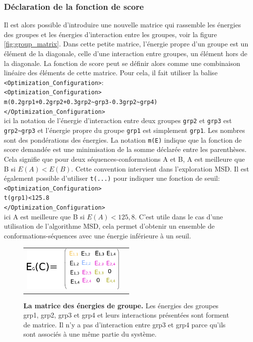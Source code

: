 \subsubsection{Déclaration de la fonction de score}
\label{sub:score}
Il est alors possible d'introduire une nouvelle matrice qui rassemble les énergies des groupes et les énergies d'interaction entre les groupes, voir la figure \ref{fig:group_matrix}. Dans cette petite matrice, l'énergie propre d'un groupe est un élément de la diagonale, celle d'une interaction entre groupes, un élément hors de la diagonale. La fonction de score peut se définir alors comme une combinaison linéaire des éléments de cette matrice. Pour cela, il fait utiliser la balise  \verb!<Optimization_Configuration>!:\\
\verb!<Optimization_Configuration>! \\
\verb!m(0.2grp1+0.2grp2+0.3grp2~grp3-0.3grp2~grp4)! \\
\verb!</Optimization_Configuration>! \\
ici la notation de l'énergie d'interaction entre deux groupes \verb!grp2! et \verb!grp3! est \verb!grp2~grp3! et l'énergie propre du groupe \verb!grp1! est simplement \verb!grp1!. Les nombres sont des pondérations des énergies. La notation \verb!m(E)! indique que la fonction de score demandée est une minimisation de la somme déclarée entre les parenthèses. Cela signifie que pour deux séquences-conformations A et B, A est meilleure que B si $E(A) < E(B)$. Cette convention intervient dans l'exploration MSD. Il est également possible d'utiliser \verb!t(...)! pour indiquer une fonction de seuil:\\
\verb!<Optimization_Configuration>! \\
\verb!t(grp1)<125.8! \\
\verb!</Optimization_Configuration>! \\
ici A est meilleure que B si $E(A)<125,8$. C'est utile dans le cas d'une utilisation de l'algorithme MSD, cela permet d'obtenir un ensemble de conformations-séquences avec une énergie inférieure à un seuil.
\begin{figure}[!htbp]
  \centering
  \begin{tabular}{cc}
    \includegraphics[width=5cm]{figure/group_matrix.png} &
  \end{tabular}
  
  \caption{\textbf{La matrice des énergies de groupe.} Les énergies des groupes grp1, grp2, grp3 et grp4 et leurs interactions présentées sont forment de matrice. Il n'y a pas d'interaction entre grp3 et grp4 parce qu'ils sont associés à une même partie du système.}
  \label{fig:groupmatrix}
\end{figure}

